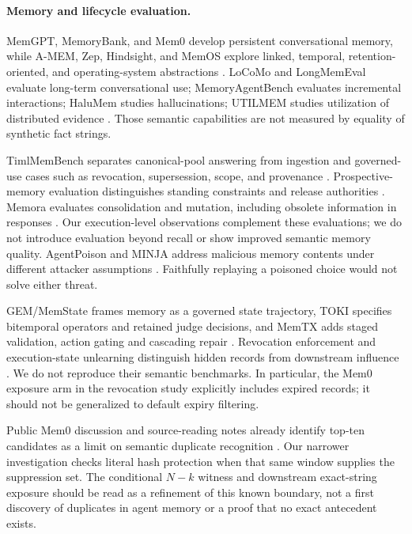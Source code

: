 \documentclass[10pt,letterpaper]{article}
\begin{document}
\paragraph{Memory and lifecycle evaluation.}
MemGPT, MemoryBank, and Mem0 develop persistent conversational memory, while A-MEM, Zep, Hindsight, and MemOS explore linked, temporal, retention-oriented, and operating-system abstractions \cite{packer2023memgpt,zhong2023memorybank,chhikara2025mem,xu2025amem,rasmussen2025zep,latimer2025hindsight,li2025memos}. LoCoMo and LongMemEval evaluate long-term conversational use; MemoryAgentBench evaluates incremental interactions; HaluMem studies hallucinations; UTILMEM studies utilization of distributed evidence \cite{maharana2024evaluating,wu2024longmemeval,hu2025evaluating,chen2025halumem,qing2026utilmem}. Those semantic capabilities are not measured by equality of synthetic fact strings.

TimlMemBench separates canonical-pool answering from ingestion and governed-use cases such as revocation, supersession, scope, and provenance \cite{zhou2026timlmembench}. Prospective-memory evaluation distinguishes standing constraints and release authorities \cite{bilgin2026capture}. Memora evaluates consolidation and mutation, including obsolete information in responses \cite{uddin2026memora}. Our execution-level observations complement these evaluations; we do not introduce evaluation beyond recall or show improved semantic memory quality. AgentPoison and MINJA address malicious memory contents under different attacker assumptions \cite{chen2024agentpoison,dong2025memory}. Faithfully replaying a poisoned choice would not solve either threat.

GEM/MemState frames memory as a governed state trajectory, TOKI specifies bitemporal operators and retained judge decisions, and MemTX adds staged validation, action gating and cascading repair \cite{orogat2026memory,wang2026toki,li2026memtx}. Revocation enforcement and execution-state unlearning distinguish hidden records from downstream influence \cite{shen2026revoked,yao2026forgetting}. We do not reproduce their semantic benchmarks. In particular, the Mem0 exposure arm in the revocation study explicitly includes expired records; it should not be generalized to default expiry filtering.

Public Mem0 discussion and source-reading notes already identify top-ten candidates as a limit on semantic duplicate recognition \cite{oleson2026recency,nie2026mem0reading}. Our narrower investigation checks literal hash protection when that same window supplies the suppression set. The conditional $N-k$ witness and downstream exact-string exposure should be read as a refinement of this known boundary, not a first discovery of duplicates in agent memory or a proof that no exact antecedent exists.
\end{document}
